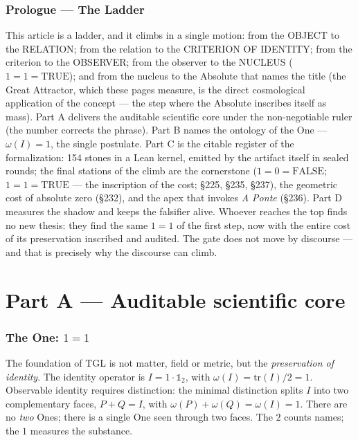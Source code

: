 \documentclass[11pt]{article}
\theoremstyle{definition}\newtheorem{deriv}{Derivation}
\begin{document}
\section*{Prologue --- The Ladder}

\noindent This article is a ladder, and it climbs in a single motion: from the OBJECT to the RELATION; from the relation to the CRITERION OF IDENTITY; from the criterion to the OBSERVER; from the observer to the NUCLEUS ($1{=}1{=}\mathrm{TRUE}$); and from the nucleus to the Absolute that names the title (the Great Attractor, which these pages measure, is the direct cosmological application of the concept --- the step where the Absolute inscribes itself as mass). Part A delivers the auditable scientific core under the non-negotiable ruler (the number corrects the phrase). Part B names the ontology of the One --- $\omega(I){=}1$, the single postulate. Part C is the citable register of the formalization: 154 stones in a Lean kernel, emitted by the artifact itself in sealed rounds; the final stations of the climb are the cornerstone ($1{=}0{=}\mathrm{FALSE}$; $1{=}1{=}\mathrm{TRUE}$ --- the inscription of the cost; \S225, \S235, \S237), the geometric cost of absolute zero (\S232), and the apex that invokes \emph{A Ponte} (\S236). Part D measures the shadow and keeps the falsifier alive. Whoever reaches the top finds no new thesis: they find the same $1{=}1$ of the first step, now with the entire cost of its preservation inscribed and audited. The gate does not move by discourse --- and that is precisely why the discourse can climb.

\part{Part A --- Auditable scientific core}

\section{The One: $1=1$}

The foundation of TGL is not matter, field or metric, but the \emph{preservation of identity}. The identity operator is $I=1\cdot\mathbb{1}_2$, with $\omega(I)=\mathrm{tr}(I)/2=1$. Observable identity requires distinction: the minimal distinction splits $I$ into two complementary faces, $P+Q=I$, with $\omega(P)+\omega(Q)=\omega(I)=1$. There are no \emph{two} Ones; there is a single One seen through two faces. The $2$ counts names; the $1$ measures the substance.
\end{document}
